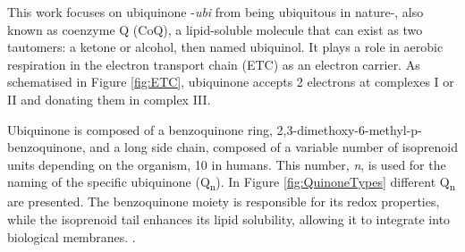This work focuses on ubiquinone -\textit{ubi} from being ubiquitous in nature-, also known as coenzyme Q (CoQ), a lipid-soluble molecule that can exist as two tautomers: a ketone or alcohol, then named ubiquinol. It plays a role in aerobic respiration in the electron transport chain (ETC) as an electron carrier. As schematised in Figure \ref{fig:ETC}, ubiquinone accepts 2 electrons at complexes I or II and donating them in complex III\cite{ernster1995biochemical}.

Ubiquinone is composed of a benzoquinone ring, 2,3-dimethoxy-6-methyl-p-benzoquinone, and a long side chain, composed of a variable number of isoprenoid units depending on the organism, 10 in humans. This number, \textit{n}, is used for the naming of the specific ubiquinone (Q\textsubscript{n}). In Figure \ref{fig:QuinoneTypes} different Q\textsubscript{n} are presented. The benzoquinone moiety is responsible for its redox properties, while the isoprenoid tail enhances its lipid solubility, allowing it to integrate into biological membranes. \cite{ernster1995biochemical}.

